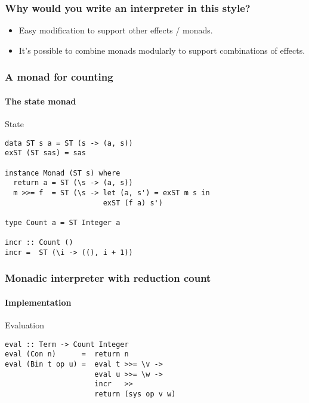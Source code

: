 \documentclass{beamer}
\begin{document}
\begin{frame}
  \frametitle{Why would you write an interpreter in this style?}
  \begin{itemize}
  \item Easy modification to support other effects / monads.
  \item It's possible to combine monads modularly to support
    combinations of effects.
  \end{itemize}
\end{frame}
\begin{frame}[fragile]
  \frametitle{A monad for counting}
  \framesubtitle{The state monad}
  \begin{alertblock}{State}
\begin{lstlisting}
data ST s a = ST (s -> (a, s))
exST (ST sas) = sas

instance Monad (ST s) where
  return a = ST (\s -> (a, s))
  m >>= f  = ST (\s -> let (a, s') = exST m s in
                       exST (f a) s')

type Count a = ST Integer a

incr :: Count ()
incr =  ST (\i -> ((), i + 1))
\end{lstlisting} 
\end{alertblock}
\end{frame}
\begin{frame}[fragile]
  \frametitle{Monadic interpreter with reduction count}
  \framesubtitle{Implementation}
\begin{exampleblock}{Evaluation}
\begin{lstlisting}
eval :: Term -> Count Integer
eval (Con n)      =  return n
eval (Bin t op u) =  eval t >>= \v ->
                     eval u >>= \w ->
                     incr   >>
                     return (sys op v w)
\end{lstlisting} 
\end{exampleblock}
\end{frame}
\end{document}
